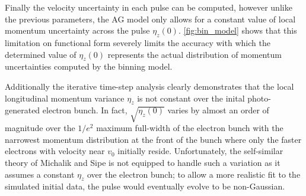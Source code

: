 Finally the velocity uncertainty in each pulse can be computed, however unlike the previous parameters, the AG model only allows for a constant value of local momentum uncertainty across the pulse $\eta_z(0)$.
\ref{fig:bin_model} shows that this limitation on functional form severely limits the accuracy with which the determined value of $\eta_z(0)$ represents the actual distribution of momentum uncertainties computed by the binning model.

Additionally the iterative time-step analysis clearly demonstrates that the local longitudinal momentum variance $ \eta_{ z } $ is not constant over the inital photo-generated electron bunch.
In fact, $ \sqrt{ \eta_{ z } ( 0 ) } $ varies by almost an order of magnitude over the $ 1/e^{2} $ maximum full-width of the electron bunch with the narrowest momentum distribution at the front of the bunch where only the faster electrons with velocity near $ v_{ 0 } $ initially reside.
Unfortunately, the self-similar theory of Michalik and Sipe \cite{michalik_analytic_2006} is not equipped to handle such a variation as it assumes a constant $ \eta_{ z } $ over the electron bunch; to allow a more realistic fit to the simulated initial data, the pulse would eventually evolve to be non-Gaussian.

